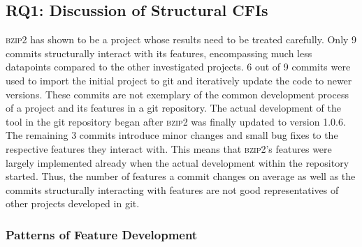 \subsection*{\textbf{RQ1: Discussion of Structural CFIs}}\label{sec:eval_struc_cfis}

\textsc{bzip2} has shown to be a project whose results need to be treated carefully.
Only 9 commits structurally interact with its features, encompassing much less datapoints compared to the other investigated projects.
6 out of 9 commits were used to import the initial project to git and iteratively update the code to newer versions.
These commits are not exemplary of the common development process of a project and its features in a git repository.
The actual development of the tool in the git repository began after \textsc{bzip2} was finally updated to version 1.0.6.
The remaining 3 commits introduce minor changes and small bug fixes to the respective features they interact with.
This means that \textsc{bzip2}'s features were largely implemented already when the actual development within the repository started.
Thus, the number of features a commit changes on average as well as the commits structurally interacting with features are not good representatives of other projects developed in git.

\subsubsection*{Patterns of Feature Development}\label{sec:eval_feature_development}

